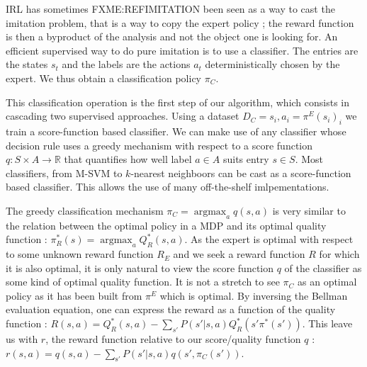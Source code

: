 \documentclass[11pt]{article}
\newcommand{\argmax}{\operatorname*{argmax}} %
\begin{document}
IRL has sometimes FXME:REFIMITATION been seen as a way to cast the imitation problem, that is a way to copy the expert policy ; the reward function is then a byproduct of the analysis and not the object one is looking for. An efficient supervised way to do pure imitation is to use a classifier. The entries are the states $s_t$ and the labels are the actions $a_t$ deterministically chosen by the expert. We thus obtain a classification policy $\pi_C$.

This classification operation is the first step of our algorithm, which consists in cascading two supervised approaches. Using a dataset $D_C = {s_i,a_i=\pi^E(s_i)}_i$ we train a score-function based classifier. We can make use of any classifier whose decision rule uses a greedy mechanism with respect to a score function $q : S \times A \rightarrow \mathbb{R}$ that quantifies how well label $a\in A$ suits entry $s\in S$. Most classifiers, from M-SVM to $k$-nearest neighboors can be cast as a score-function based classifier. This allows the use of many off-the-shelf imlpementations.

The greedy classification mechanism $\pi_C = \argmax_a q(s,a)$ is very similar to the relation between the optimal policy in a MDP and its optimal quality function : $\pi^*_R(s) = \argmax_aQ^*_R(s,a)$. As the expert is optimal with respect to some unknown reward function $R_E$ and we seek a reward function $R$ for which it is also optimal, it is only natural to view the score function $q$ of the classifier as some kind of optimal quality function. It is not a stretch to see $\pi_C$ as an optimal policy as it has been built from $\pi^E$ which is optimal. By inversing the Bellman evaluation equation, one can express the reward as a function of the quality function : $R(s,a) = Q^*_R(s,a) - \sum_{s'}P(s'|s,a)Q^*_R(s'\pi^*(s'))$. This leave us with $r$, the reward function relative to our score/quality function $q$ : $r(s,a) =q(s,a) - \sum_{\mathrm{s'}}P(s'|s,a)q(s',\pi_C(s'))$.
\end{document}
